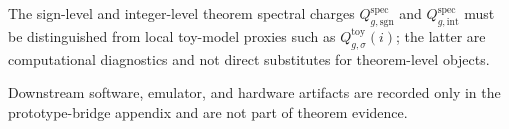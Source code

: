 The sign-level and integer-level theorem spectral charges $Q^{\mathrm{spec}}_{g,\mathrm{sgn}}$ and $Q^{\mathrm{spec}}_{g,\mathrm{int}}$ must be distinguished from local toy-model proxies such as $Q^{\mathrm{toy}}_{g,\sigma}(i)$; the latter are computational diagnostics and not direct substitutes for theorem-level objects.

Downstream software, emulator, and hardware artifacts are recorded only in the prototype-bridge appendix and are not part of theorem evidence.
\endgroup